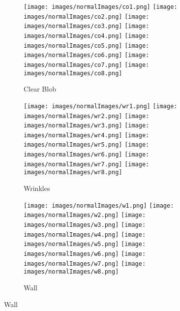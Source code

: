 \documentclass[review,12pt,3p]{elsarticle}
\begin{document}
\begin{figure}
        \begin{subfigure}[b]{0.5\textwidth}
                \texttt{[image: images/normalImages/co1.png]}
                \texttt{[image: images/normalImages/co2.png]}
                \texttt{[image: images/normalImages/co3.png]}
                \texttt{[image: images/normalImages/co4.png]}
                \texttt{[image: images/normalImages/co5.png]}
                \texttt{[image: images/normalImages/co6.png]}
                \texttt{[image: images/normalImages/co7.png]}
                \texttt{[image: images/normalImages/co8.png]}
                \caption{Clear Blob}\label{fig:dataset_3}
        \end{subfigure}%
        
        \begin{subfigure}[b]{0.5\textwidth}
                \texttt{[image: images/normalImages/wr1.png]}
                \texttt{[image: images/normalImages/wr2.png]}
                \texttt{[image: images/normalImages/wr3.png]}
                \texttt{[image: images/normalImages/wr4.png]}
                \texttt{[image: images/normalImages/wr5.png]}
                \texttt{[image: images/normalImages/wr6.png]}
                \texttt{[image: images/normalImages/wr7.png]}
                \texttt{[image: images/normalImages/wr8.png]}
                \caption{Wrinkles}\label{fig:dataset_4}
        \end{subfigure}%
        
        \begin{subfigure}[b]{0.5\textwidth}
                \texttt{[image: images/normalImages/w1.png]}
                \texttt{[image: images/normalImages/w2.png]}
                \texttt{[image: images/normalImages/w3.png]}
                \texttt{[image: images/normalImages/w4.png]}
                \texttt{[image: images/normalImages/w5.png]}
                \texttt{[image: images/normalImages/w6.png]}
                \texttt{[image: images/normalImages/w7.png]}
                \texttt{[image: images/normalImages/w8.png]}
                \caption{Wall}\label{fig:dataset_5}
        \end{subfigure}%
        

\end{figure}
\end{document}

